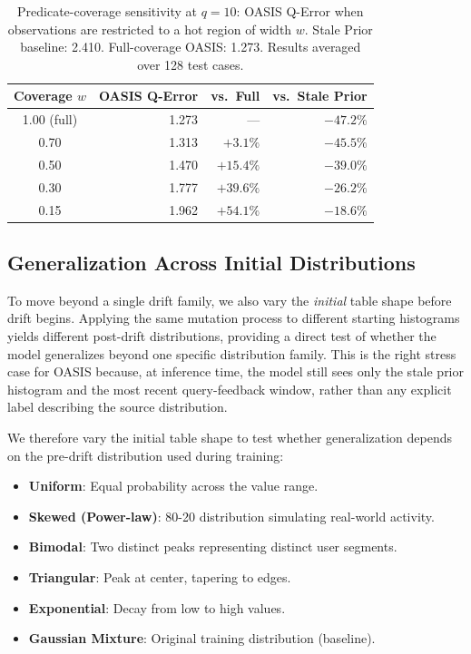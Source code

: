 \documentclass[runningheads]{llncs}
\begin{document}
\begin{table}[t]
  \centering
  \caption{Predicate-coverage sensitivity at $q{=}10$: OASIS Q-Error when observations are restricted to a hot region of width $w$. Stale Prior baseline: 2.410. Full-coverage OASIS: 1.273. Results averaged over 128 test cases.}
  \label{tab:coverage_sensitivity}
  \setlength{\tabcolsep}{5pt}
  \begin{tabular}{c r r r}
    \toprule
    Coverage $w$ & OASIS Q-Error & vs.\ Full & vs.\ Stale Prior \\
    \midrule
    1.00 (full)  & 1.273 & ---    & $-47.2\%$ \\
    0.70         & 1.313 & $+3.1\%$  & $-45.5\%$ \\
    0.50         & 1.470 & $+15.4\%$ & $-39.0\%$ \\
    0.30         & 1.777 & $+39.6\%$ & $-26.2\%$ \\
    0.15         & 1.962 & $+54.1\%$ & $-18.6\%$ \\
    \bottomrule
  \end{tabular}
\end{table}

\subsection{Generalization Across Initial Distributions}
\label{sec:dist_generalization}

To move beyond a single drift family, we also vary the \emph{initial} table shape before drift begins. Applying the same mutation process to different starting histograms yields different post-drift distributions, providing a direct test of whether the model generalizes beyond one specific distribution family. This is the right stress case for OASIS because, at inference time, the model still sees only the stale prior histogram and the most recent query-feedback window, rather than any explicit label describing the source distribution.

We therefore vary the initial table shape to test whether generalization depends on the pre-drift distribution used during training:

\begin{itemize}[leftmargin=*]
  \item \textbf{Uniform}: Equal probability across the value range.
  \item \textbf{Skewed (Power-law)}: 80-20 distribution simulating real-world activity.
  \item \textbf{Bimodal}: Two distinct peaks representing distinct user segments.
  \item \textbf{Triangular}: Peak at center, tapering to edges.
  \item \textbf{Exponential}: Decay from low to high values.
  \item \textbf{Gaussian Mixture}: Original training distribution (baseline).
\end{itemize}
\end{document}
